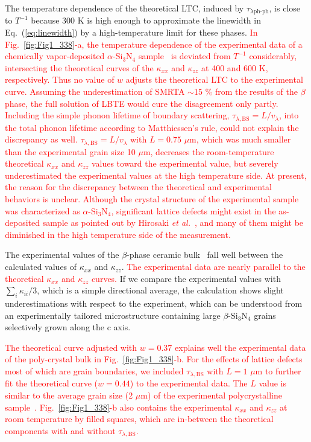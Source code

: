 \documentclass[twocolumn,amsmath,amssymb,a4paper,prb,superscriptaddress,floatfix]{revtex4-1}
\begin{document}
The temperature dependence of the theoretical LTC, induced by
$\tau_{\lambda\text{ph-ph}}$, is close to $T^{-1}$ because 300 K is high
enough to approximate the linewidth in Eq.~(\ref{eq:linewidth}) by a
high-temperature limit for these phases.
%
\textcolor{red}{In Fig.~\ref{fig:Fig1_338}-a, the temperature dependence
of the experimental data of a chemically vapor-deposited
$\alpha$-Si$_3$N$_4$ sample~\cite{hirai} is deviated from $T^{-1}$ considerably,
intersecting the theoretical curves of the $\kappa$$_{xx}$ and
$\kappa$$_{zz}$ at 400 and 600 K, respectively. Thus no value of $w$
adjusts the theoretical LTC to the experimental curve. Assuming the
underestimation of SMRTA $\sim$15 \% from the results of the $\beta$
phase, the full solution of LBTE would cure the disagreement only
partly. Including the simple phonon lifetime of boundary scattering,
$\tau_{\lambda,\text{BS}} =L/v_\lambda$, into the total phonon lifetime
according to Matthiessen's rule, could not explain the discrepancy as
well. $\tau_{\lambda,\text{BS}} =L/v_\lambda$ with $L = 0.75$
$\mu\text{m}$, which was much smaller than the experimental grain size
10 $\mu\text{m}$, decreases the room-temperature theoretical $\kappa$$_{xx}$ and
$\kappa$$_{zz}$ values toward the experimental value, but severely
underestimated the experimental values at the high temperature side. At
present, the reason for the discrepancy between the theoretical and
experimental behaviors is unclear. Although the crystal structure of the
experimental sample was characterized as $\alpha$-Si$_3$N$_4$,
significant lattice defects might exist in the as-deposited sample as
pointed out by Hirosaki {\it et al.}~\cite{hirosaki-md}, and many of them might be
diminished in the high temperature side of the measurement.}

The experimental values of the $\beta$-phase ceramic bulk~\cite{hirosaki} fall well
between the calculated values of $\kappa$$_{xx}$ and $\kappa$$_{zz}$.
%
\textcolor{red}{The experimental data are nearly parallel to the
theoretical $\kappa$$_{xx}$ and $\kappa$$_{zz}$ curves.}
%
If we compare the experimental values with $\sum_i \kappa_{ii}/3$, which is
a simple directional average, the calculation shows slight
underestimations with respect to the experiment, which can be understood
from an experimentally tailored microstructure containing large
$\beta$-Si$_3$N$_4$ grains selectively grown along the c axis.~\cite{hirosaki}

\textcolor{red}{The theoretical curve adjusted with $w=0.37$ explains
well the experimental data of the poly-crystal bulk in
Fig.~\ref{fig:Fig1_338}-b. For the effects of lattice defects most of
which are grain boundaries, we included $\tau_{\lambda,\text{BS}}$ with
$L = 1$ $\mu\text{m}$ to further fit the theoretical curve ($w=0.44$) to
the experimental data. The $L$ value is similar to the average grain
size (2 $\mu\text{m}$) of the experimental polycrystalline
sample~\cite{hirosaki}. Fig.~\ref{fig:Fig1_338}-b also contains the experimental
$\kappa$$_{xx}$ and $\kappa$$_{zz}$ at room temperature by filled
squares, which are in-between the theoretical components with and
without $\tau_{\lambda,\text{BS}}$.}
\end{document}
